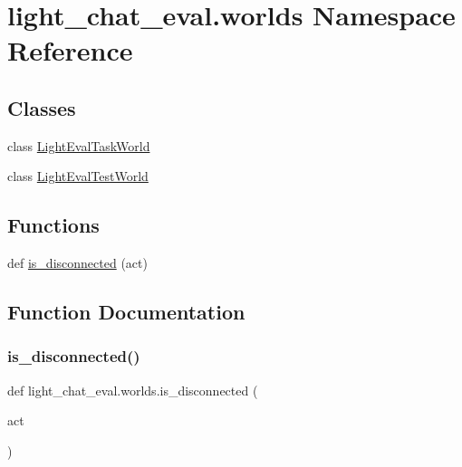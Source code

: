\hypertarget{namespacelight__chat__eval_1_1worlds}{}\section{light\+\_\+chat\+\_\+eval.\+worlds Namespace Reference}
\label{namespacelight__chat__eval_1_1worlds}
\subsection*{Classes}
\begin{DoxyCompactItemize}
\item 
class \hyperlink{classlight__chat__eval_1_1worlds_1_1LightEvalTaskWorld}{Light\+Eval\+Task\+World}
\item 
class \hyperlink{classlight__chat__eval_1_1worlds_1_1LightEvalTestWorld}{Light\+Eval\+Test\+World}
\end{DoxyCompactItemize}
\subsection*{Functions}
\begin{DoxyCompactItemize}
\item 
def \hyperlink{namespacelight__chat__eval_1_1worlds_a0813e8622db7b552e60a63826daf8ace}{is\+\_\+disconnected} (act)
\end{DoxyCompactItemize}


\subsection{Function Documentation}
\mbox{\label{namespacelight__chat__eval_1_1worlds_a0813e8622db7b552e60a63826daf8ace}} 
\subsubsection{\texorpdfstring{is\+\_\+disconnected()}{is\_disconnected()}}
{\footnotesize\ttfamily def light\+\_\+chat\+\_\+eval.\+worlds.\+is\+\_\+disconnected (\begin{DoxyParamCaption}\item[{}]{act }\end{DoxyParamCaption})}



